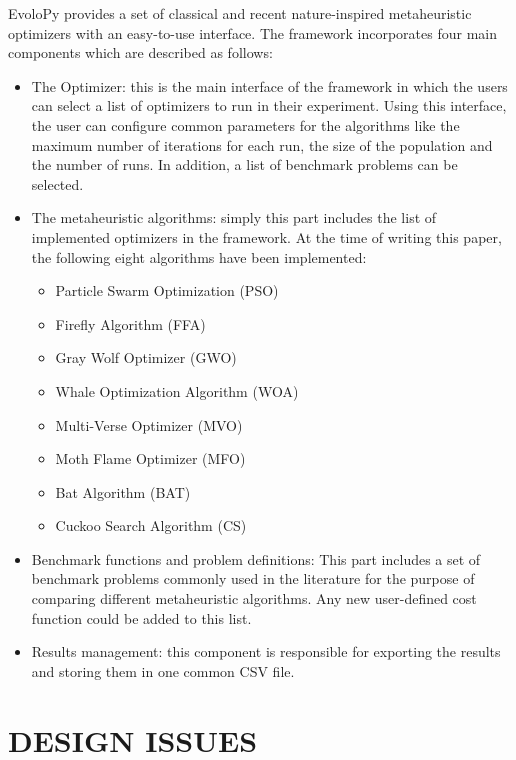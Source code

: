 \documentclass[a4paper,twoside]{article}
\begin{document}
EvoloPy provides a set of classical and recent nature-inspired metaheuristic optimizers with an easy-to-use interface. The framework incorporates four main components which are described as follows: 

\begin{itemize}
\item The Optimizer: this is the main interface of the framework in which the users can select a list of optimizers to run in their experiment. Using this interface, the user can configure common parameters for the algorithms like the maximum number of iterations for each run, the size of the population and the number of runs. In addition, a list of benchmark problems can be selected.

\item The metaheuristic algorithms: simply this part includes the list of implemented optimizers in the framework. At the time of writing this paper, the following eight algorithms have been implemented:

\begin{itemize}
\item Particle Swarm Optimization (PSO)
\item  Firefly Algorithm (FFA) \cite{Yang2010FFA} 
\item Gray Wolf Optimizer (GWO)\cite{Mirjalili201446}
\item Whale Optimization Algorithm (WOA) \cite{Mirjalili201651}
\item Multi-Verse Optimizer (MVO) \cite{Mirjalili2016}
\item Moth Flame Optimizer (MFO) \cite{Mirjalili2015228}
\item Bat Algorithm (BAT) \cite{Yang2010}
\item Cuckoo Search Algorithm (CS) \cite{Yang2009}
\end{itemize}



\item Benchmark functions and problem definitions: This part includes a set of benchmark problems commonly used in the literature for the purpose of comparing different metaheuristic algorithms. Any new user-defined cost function could be added to this list.

\item Results management: this component is responsible for exporting the results and storing them in one common CSV file. 
\end{itemize}


\section{\uppercase{Design issues}}
\end{document}
